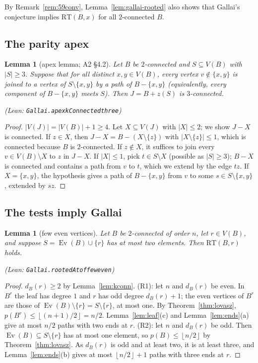 \documentclass[11pt]{amsart}
\newtheorem{lemma}[theorem]{Lemma}
\theoremstyle{definition}
\theoremstyle{remark}
\renewcommand{\_}{\oldunderscore\allowbreak}
\newcommand{\leanst}[1]{\par{\raggedright\small\textup{(Lean: \texttt{#1})}\par}}
\newcommand{\fl}[1]{\left\lfloor #1\right\rfloor}
\newcommand{\RT}{\mathrm{RT}}
\newcommand{\Ev}{\operatorname{Ev}}
\begin{document}
By Remark~\ref{rem:59conv}, Lemma~\ref{lem:gallai-rooted} also shows that Gallai's conjecture
implies $\RT(B,x)$ for all $2$-connected $B$.

\subsection{The parity apex}

\begin{lemma}[apex lemma; A2 \S4.2]\label{lem:apex}
Let $B$ be $2$-connected and $S\subseteq V(B)$ with $|S|\ge3$. Suppose that for all distinct
$x,y\in V(B)$, every vertex $v\notin\{x,y\}$ is joined to a vertex of $S\setminus\{x,y\}$ by a path of
$B-\{x,y\}$ (equivalently, every component of $B-\{x,y\}$ meets $S$). Then $J=B+z(S)$ is
$3$-connected.
\leanst{Gallai.apex\_kConnected\_three}
\end{lemma}

\begin{proof}
$|V(J)|=|V(B)|+1\ge4$. Let $X\subseteq V(J)$ with $|X|\le2$; we show $J-X$ is connected. If $z\in X$,
then $J-X=B-(X\setminus\{z\})$ with $|X\setminus\{z\}|\le1$, which is connected because $B$ is
$2$-connected. If $z\notin X$, it suffices to join every $v\in V(B)\setminus X$ to $z$ in $J-X$. If
$|X|\le1$, pick $t\in S\setminus X$ (possible as $|S|\ge3$); $B-X$ is connected and contains a path
from $v$ to $t$, which we extend by the edge $tz$. If $X=\{x,y\}$, the hypothesis gives a path of
$B-\{x,y\}$ from $v$ to some $s\in S\setminus\{x,y\}$, extended by $sz$.
\end{proof}

\subsection{The tests imply Gallai}

\begin{lemma}[few even vertices]\label{lem:fewEven}
Let $B$ be $2$-connected of order $n$, let $r\in V(B)$, and suppose $S=\Ev(B)\cup\{r\}$ has at most
two elements. Then $\RT(B,r)$ holds.
\leanst{Gallai.rootedAt\_of\_few\_even}
\end{lemma}

\begin{proof}
$d_B(r)\ge2$ by Lemma~\ref{lem:kconn}. (R1): let $n$ and $d_B(r)$ be even. In $B^r$ the leaf has
degree $1$ and $r$ has odd degree $d_B(r)+1$; the even vertices of $B^r$ are those of
$\Ev(B)\setminus\{r\}=S\setminus\{r\}$, at most one. By Theorem~\ref{thm:lovasz},
$p(B^r)\le\fl{(n+1)/2}=n/2$. Lemma~\ref{lem:leaf}(c) and Lemma~\ref{lem:ends}(a) give at most $n/2$
paths with two ends at $r$. (R2): let $n$ and $d_B(r)$ be odd. Then $\Ev(B)\subseteq
S\setminus\{r\}$ has at most one element, so $p(B)\le\fl{n/2}$ by Theorem~\ref{thm:lovasz}. As
$d_B(r)$ is odd and at least two, it is at least three, and Lemma~\ref{lem:ends}(b) gives at most
$\fl{n/2}+1$ paths with three ends at $r$.
\end{proof}
\end{document}

